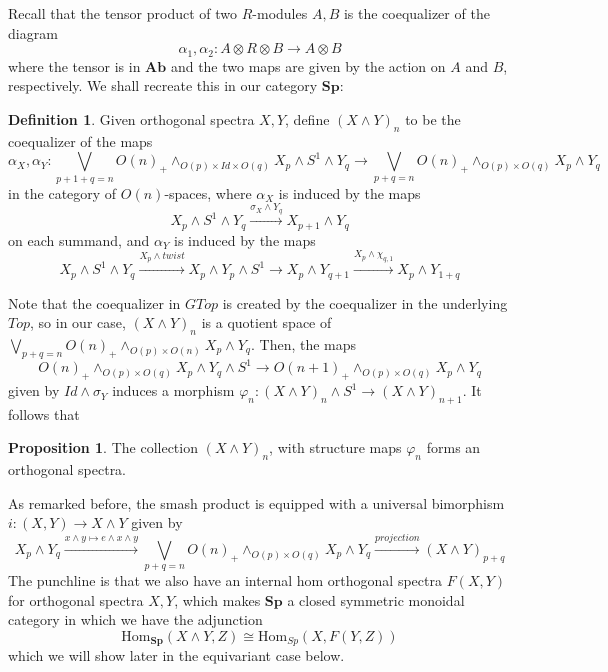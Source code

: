 \documentclass{article}
\theoremstyle{definition}
\theoremstyle{definition}
\newtheorem{definition}{Definition}[theorem]
\theoremstyle{definition}
\theoremstyle{definition}
\newtheorem{proposition}{Proposition}[theorem]
\theoremstyle{definition}
\theoremstyle{definition}
\theoremstyle{definition}
\begin{document}
Recall that the tensor product of two $R$-modules $A,B$ is the coequalizer of the diagram 
\[\alpha_1,\alpha_2: A\otimes R\otimes B\to A\otimes B\]
where the tensor is in $\textbf{Ab}$ and the two maps are given by the action on $A$ and $B$, respectively. We shall recreate this in our category $\textbf{Sp}$:


\begin{tcolorbox}[colback=purple!5!white,colframe=purple!75!black]
\begin{definition}
Given orthogonal spectra $X,Y$, define $(X\wedge Y)_n$ to be the coequalizer of the maps
\[\alpha_X,\alpha_Y: \bigvee_{p+1+q=n}O(n)_+\wedge_{O(p)\times Id\times O(q)}X_p\wedge S^1\wedge Y_q\to  \bigvee_{p+q=n}O(n)_+\wedge_{O(p)\times O(q)}X_p\wedge Y_q\]
in the category of $O(n)$-spaces, where $\alpha_X$ is induced by the maps
\[X_p\wedge S^1\wedge Y_q\xrightarrow{\sigma_X\wedge Y_q} X_{p+1}\wedge Y_q\] on each summand, and $\alpha_Y$ is induced by the maps 
\[X_p\wedge S^1\wedge Y_q\xrightarrow{X_p\wedge twist}X_p\wedge Y_p\wedge S^1\to X_{p}\wedge Y_{q+1}\xrightarrow{X_p\wedge \chi_{q,1}} X_{p}\wedge Y_{1+q}\]
\end{definition}
\end{tcolorbox}
Note that the coequalizer in $GTop$ is created by the coequalizer in the underlying $Top$, so in our case, $(X\wedge Y)_n$ is a quotient space of 
$\bigvee_{p+q=n}O(n)_+\wedge_{O(p)\times O(n)}X_p\wedge Y_q$. Then, the maps 
\[O(n)_+\wedge_{O(p)\times O(q)}X_p\wedge Y_q\wedge S^1\to O(n+1)_+\wedge_{O(p)\times O(q)}X_p\wedge Y_q\]
given by $Id\wedge \sigma_Y$ induces a morphism $\varphi_n:(X\wedge Y)_n\wedge S^1\to (X\wedge Y)_{n+1}$. It follows that 

\begin{tcolorbox}[colback=blue!5!white,colframe=blue!30!white]
\begin{proposition}
The collection $(X\wedge Y)_n$, with structure maps $\varphi_n$ forms an orthogonal spectra. 
\end{proposition}
\end{tcolorbox}

As remarked before, the smash product is equipped with a universal bimorphism $i: (X,Y)\to X\wedge Y$ given by 
\[X_p\wedge Y_q\xrightarrow{x\wedge y\mapsto e\wedge x\wedge y} \bigvee_{p+q=n}O(n)_+\wedge_{O(p)\times O(q)}X_p\wedge Y_q\xrightarrow{projection} (X\wedge Y)_{p+q}\]
The punchline is that we also have an internal hom orthogonal spectra $F(X,Y)$ for orthogonal spectra $X,Y$, which makes $\textbf{Sp}$ a closed symmetric monoidal category in which we have the adjunction 
\[\textrm{Hom}_{\textbf{Sp}}(X\wedge Y,Z)\cong \textrm{Hom}_{{Sp}}(X,F(Y,Z))\]
which we will show later in the equivariant case below. 
\end{document}

